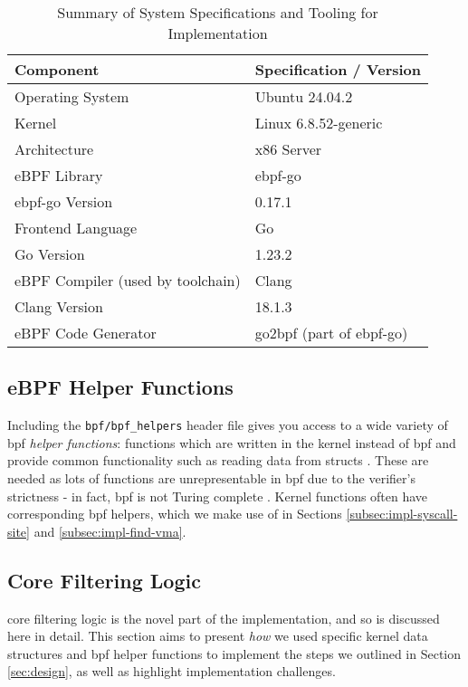 \begin{table}[h]
\centering
\caption{Summary of System Specifications and Tooling for \af Implementation}
\label{tab:specs_tooling}
\begin{tabular}{ll}
\toprule %
\textbf{Component} & \textbf{Specification / Version} \\
\midrule %
Operating System      & Ubuntu 24.04.2 \\
Kernel                & Linux 6.8.52-generic \\
Architecture          & x86 Server \\
eBPF Library          & ebpf-go \\
ebpf-go Version       & 0.17.1 \\
Frontend Language     & Go \\
Go Version            & 1.23.2 \\
eBPF Compiler (used by toolchain) & Clang \\
Clang Version         & 18.1.3 \\
eBPF Code Generator   & go2bpf (part of ebpf-go) \\
\bottomrule %
\end{tabular}
\end{table}

\subsection{eBPF Helper Functions}

Including the \texttt{bpf/bpf\_helpers} header file gives you access to a wide
variety of \ac{bpf} \textit{helper functions}: functions which are written in
the kernel instead of \ac{bpf} and provide common functionality such as reading
data from structs \cite{ebpf-helper-functions-2025, ebpf-bpf-probe-read-user-2024}. 
These are needed as lots of functions are unrepresentable in 
\ac{bpf} due to the verifier's strictness - in fact, \ac{bpf} is not Turing
complete \cite{gregg-bpf-performance-tools-2019}. Kernel functions often have
corresponding \ac{bpf} helpers, which we make use of in Sections
\ref{subsec:impl-syscall-site} and \ref{subsec:impl-find-vma}.

\subsection{Core Filtering Logic}

\afg core filtering logic is the novel part of the implementation, and so is
discussed here in detail. This section aims to present \textit{how} we used
specific kernel data structures and \ac{bpf} helper functions to implement the
steps we outlined in Section \ref{sec:design}, as well as highlight
implementation challenges.

